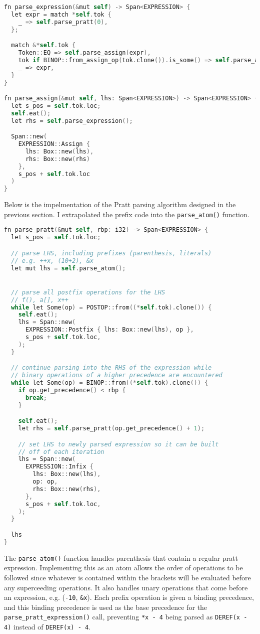 \begin{lstlisting}[language=C]
fn parse_expression(&mut self) -> Span<EXPRESSION> {
  let expr = match *self.tok {
    _ => self.parse_pratt(0),
  };

  match &*self.tok {
    Token::EQ => self.parse_assign(expr),
    tok if BINOP::from_assign_op(tok.clone()).is_some() => self.parse_assign_op(expr),
    _ => expr,
  }
}

fn parse_assign(&mut self, lhs: Span<EXPRESSION>) -> Span<EXPRESSION> {
  let s_pos = self.tok.loc;
  self.eat();
  let rhs = self.parse_expression();

  Span::new(
    EXPRESSION::Assign { 
      lhs: Box::new(lhs), 
      rhs: Box::new(rhs) 
    }, 
    s_pos + self.tok.loc
  )
}
\end{lstlisting}

Below is the impelmentation of the Pratt parsing algorithm designed in the previous section. I extrapolated the prefix code into the \texttt{parse\_atom()} function. 

\begin{lstlisting}[language=C]
fn parse_pratt(&mut self, rbp: i32) -> Span<EXPRESSION> {
  let s_pos = self.tok.loc;

  // parse LHS, including prefixes (parenthesis, literals)
  // e.g. ++x, (10+2), &x
  let mut lhs = self.parse_atom();


  // parse all postfix operations for the LHS
  // f(), a[], x++
  while let Some(op) = POSTOP::from((*self.tok).clone()) {
    self.eat();
    lhs = Span::new(
      EXPRESSION::Postfix { lhs: Box::new(lhs), op },
      s_pos + self.tok.loc,
    );
  }

  // continue parsing into the RHS of the expression while 
  // binary operations of a higher precedence are encountered
  while let Some(op) = BINOP::from((*self.tok).clone()) {
    if op.get_precedence() < rbp {
      break;
    }

    self.eat();
    let rhs = self.parse_pratt(op.get_precedence() + 1);

    // set LHS to newly parsed expression so it can be built
    // off of each iteration 
    lhs = Span::new(
      EXPRESSION::Infix {
        lhs: Box::new(lhs),
        op: op,
        rhs: Box::new(rhs),
      },
      s_pos + self.tok.loc,
    );
  }

  lhs
}
\end{lstlisting}

The \texttt{parse\_atom()} function handles parenthesis that contain a regular pratt expression. Implementing this as an atom allows the order of operations to be followed since whatever is contained within the brackets will be evaluated before any superceeding operations. It also handles unary operations that come before an expression, e.g. (\texttt{-10}, \texttt{\&x}). Each prefix operation is given a binding precedence, and this binding precedence is used as the base precedence for the \texttt{parse\_pratt\_expression()} call, preventing \texttt{*x - 4} being parsed as \texttt{DEREF(x - 4)} instead of \texttt{DEREF(x) - 4}. 

